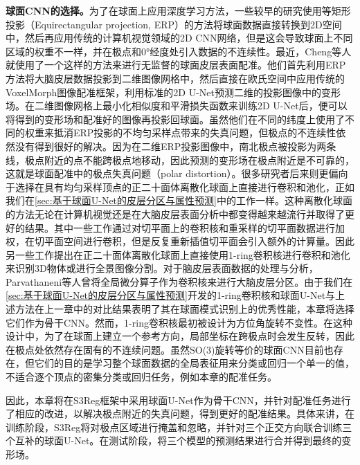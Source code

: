 \textbf{球面CNN的选择。}为了在球面上应用深度学习方法，一些较早的研究使用等矩形投影（Equirectangular projection, ERP）的方法将球面数据\cite{tateno2018distortion,hu2017deep,coors2018spherenet}直接转换到2D空间中，然后再应用传统的计算机视觉领域的2D CNN网络，但是这会导致球面上不同区域的权重不一样，并在极点和\ang{0}经度处引入数据的不连续性。最近，Cheng等人\cite{cheng2020cortical}就使用了一个这样的方法来进行无监督的球面皮层表面配准。他们首先利用ERP方法将大脑皮层数据投影到二维图像网格中，然后直接在欧氏空间中应用传统的VoxelMorph图像配准框架\cite{dalca2018unsupervised}，利用标准的2D U-Net\cite{ronneberger2015u}预测二维的投影图像中的变形场。在二维图像网格上最小化相似度和平滑损失函数来训练2D U-Net后，便可以将得到的变形场和配准好的图像再投影回球面。虽然他们在不同的纬度上使用了不同的权重来抵消ERP投影的不均匀采样点带来的失真问题，但极点的不连续性依然没有得到很好的解决。因为在二维ERP投影图像中，南北极点被投影为两条线，极点附近的点不能跨极点地移动，因此预测的变形场在极点附近是不可靠的，这就是球面配准中的极点失真问题（polar distortion）。很多研究者后来则更偏向于选择在具有均匀采样顶点的正二十面体离散化球面上直接进行卷积和池化，正如我们在\ref{sec:基于球面U-Net的皮层分区与属性预测}中的工作一样。这种离散化球面的方法无论在计算机视觉\cite{zhao2018distortion,rao2019spherical,jiang2019spherical}还是在大脑皮层表面分析\cite{zhao2019spherical_ipmi,wu2018registration,seong2018geometric}中都变得越来越流行并取得了更好的结果。其中一些工作通过对切平面上的卷积核和重采样的切平面数据进行加权，在切平面空间进行卷积\cite{zhao2018distortion,wu2018registration,seong2018geometric}，但是反复重新插值切平面会引入额外的计算量。因此另一些工作提出在正二十面体离散化球面上直接使用1-ring卷积核进行卷积和池化来识别3D物体\cite{rao2019spherical}或进行全景图像分割\cite{jiang2019spherical}。对于脑皮层表面数据的处理与分析，Parvathaneni等人\cite{parvathaneni2019cortical}曾将全局微分算子\cite{jiang2019spherical}作为卷积核来进行大脑皮层分区。由于我们在\ref{sec:基于球面U-Net的皮层分区与属性预测}开发的1-ring卷积核和球面U-Net与上述方法在上一章中的对比结果表明了其在球面模式识别上的优秀性能，本章将选择它们作为骨干CNN。然而，1-ring卷积核最初被设计为方位角旋转不变性。在这种设计中，为了在球面上建立一个参考方向，局部坐标在跨极点时会发生反转，因此在极点处依然存在固有的不连续问题。虽然SO(3)旋转等价的球面CNN\cite{esteves2018learning,cohen2018spherical}目前也存在，但它们的目的是学习整个球面数据的全局表征用来分类或回归一个单一的值，不适合逐个顶点的密集分类或回归任务，例如本章的配准任务。

因此，本章将在S3Reg框架中采用球面U-Net作为骨干CNN，并针对配准任务进行了相应的改进，以解决极点附近的失真问题，得到更好的配准结果。具体来讲，在训练阶段，S3Reg将对极点区域进行掩盖和忽略，并针对三个正交方向联合训练三个互补的球面U-Net。在测试阶段，将三个模型的预测结果进行合并得到最终的变形场。

